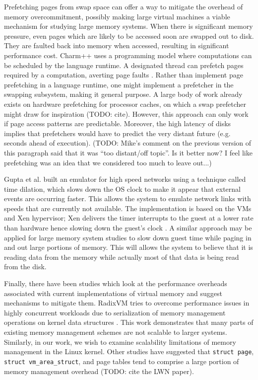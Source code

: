 \documentclass[twocolumn,11pt]{article}
\begin{document}
Prefetching pages from swap space can offer a way to mitigate the overhead of
memory overcommitment, possibly making large virtual machines a viable
mechanism for studying large memory systems. When there is significant memory
pressure, even pages which are likely to be accessed soon are swapped out to
disk. They are faulted back into memory when accessed, resulting in significant
performance cost.  Charm++ uses a programming model where computations can be
scheduled by the language runtime. A designated thread can prefetch pages
required by a computation, averting page faults \cite{charmpp}. Rather than
implement page prefetching in a language runtime, one might implement a
prefetcher in the swapping subsystem, making it general purpose. A large body
of work already exists on hardware prefetching for processor caches, on which a
swap prefetcher might draw for inspiration (TODO: cite). However, this approach
can only work if page access patterns are predictable. Moreover, the high
latency of disks implies that prefetchers would have to predict the very
distant future (e.g. seconds ahead of execution). (TODO: Mike's comment on the
previous version of this paragraph said that it was ``too distant/off topic''.
Is it better now? I feel like prefetching was an idea that we considered too
much to leave out...)

Gupta et al. built an emulator for high speed networks using a technique called
time dilation, which slows down the OS clock to make it appear that external
events are occurring faster. This allows the system to emulate network links
with speeds that are currently not available. The implementation is based on
the VMs and Xen hypervisor; Xen delivers the timer interrupts to the guest at a
lower rate than hardware hence  slowing down the guest’s clock \cite{timedil}.
A similar approach may be applied for large memory system studies to slow down
guest time while paging in and out large portions of memory. This will allows
the system to believe that it is reading data from the memory while actually
most of that data is being read from the disk.

Finally, there have been studies which look at the performance overheads
associated with current implementations of virtual memory and suggest mechanisms
to mitigate them. RadixVM tries to overcome performance issues in highly
concurrent workloads due to serialization of memory management operations on
kernel data structures \cite{radixvm}. This work demonstrates that many parts of
existing memory management schemes are not scalable to larger systems.
Similarly, in our work, we wish to examine scalability limitations of memory
management in the Linux kernel. Other studies have suggested that \texttt{struct
page}, \texttt{struct vm\_area\_struct}, and page tables tend to comprise a
large portion of memory management overhead \cite{simics} (TODO: cite the LWN
paper).

{}

\end{document}
